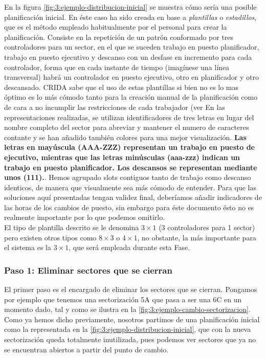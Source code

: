 En la figura \autoref{fig:3:ejemplo-distribucion-inicial} se muestra cómo sería una posible planificación inicial. En éste caso ha sido creada en base a \textit{plantillas} o \textit{estadillos}, que es el método empleado habitualmente por el personal para crear la planificación. Consiste en la repetición de un patrón conformado por tres 
controladores para un sector, en el que se suceden trabajo en puesto planificador, trabajo en puesto ejecutivo y descanso con un desfase en incremento para cada controlador, forma que en cada instante de tiempo (imagínese una línea transversal) habrá un controlador en puesto ejecutivo, otro en planificador y otro descansado. \gls{CRIDA} sabe que el uso de estas plantillas si bien no es lo mas óptimo es lo más cómodo tanto para la creación manual de la planificación como de cara a no incumplir las restricciones de cada trabajador (ver %
En las representaciones realizadas, se utilizan identificadores de tres letras en lugar del nombre completo del sector para abreviar y mantener el numero de caracteres contante y se han añadido también colores para una mejor visualización.
\textbf{Las letras en mayúscula (AAA-ZZZ) representan un trabajo en puesto de ejecutivo, mientras que las letras minúsculas (aaa-zzz) indican un trabajo en puesto planificador. Los descansos se representan mediante unos (111).}.
Hemos agrupado slots contiguos tanto de trabajo como descanso identicos, de manera que visualmente sea más cómodo de entender. Para que las soluciones aquí presentadas tengan validez final, deberíamos añadir indicadores de las horas de los cambios de puesto, sin embargo para éste documento ésto no es realmente importante por lo que podemos omitirlo.
\\

El tipo de plantilla descrito se le denomina $3\times1$ (3 controladores para 1 sector) pero existen otros tipos como $8\times3$ o $4\times1$, no obstante, la más importante para el sistema es la $3\times1$, que será empleada durante esta Fase.

\subsubsection{Paso 1: Eliminar sectores que se cierran}
El primer paso es el encargado de eliminar los sectores que se cierran. Pongamos por ejemplo que tenemos una 
sectorización 5A que pasa a ser una 6C en un momento dado, tal y como se ilustra en la 
\autoref{fig:3:ejemplo-cambio-sectorizacion}. Como ya hemos dicho previamente, nosotros partimos de una planificación inicial como la representada en la \autoref{fig:3:ejemplo-distribucion-inicial}, que con la nueva sectorización queda totalmente inutilizada, pues podemos ver sectores que ya no se encuentran abiertos a partir del punto de cambio.
\\

